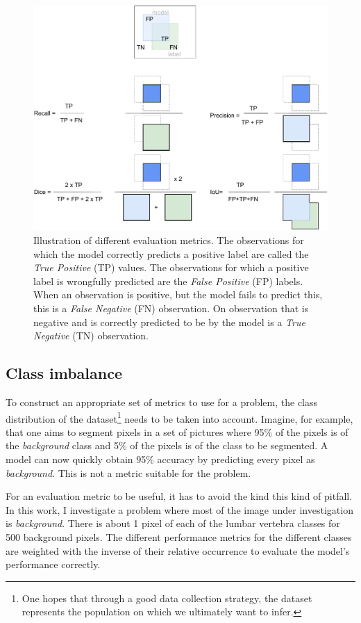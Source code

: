 \begin{figure}
    \centering
    \includegraphics[width=.95\textwidth]{images/Metrics.pdf}
    \caption{Illustration of different evaluation metrics. 
    The observations for which the model correctly predicts a positive label are called the \textit{True Positive} (TP) values.
    The observations for which a positive label is wrongfully predicted are the \textit{False Positive} (FP) labels. 
    When an observation is positive, but the model fails to predict this, this is a \textit{False Negative} (FN) observation.
    On observation that is negative and is correctly predicted to be by the model is a \textit{True Negative} (TN) observation.\label{fig:metrics}
    }
\end{figure}

\subsection{Class imbalance\label{sec:class_imbalance}}
\par{
    To construct an appropriate set of metrics to use for a problem, the class distribution of the dataset\footnote{
        One hopes that through a good data collection strategy, the dataset represents the population on which we ultimately want to infer.
        } needs to be taken into account.
    Imagine, for example, that one aims to segment pixels in a set of pictures where 95\% of the pixels is of the \textit{background} class and 5\% of the pixels is of the class to be segmented.
    A model can now quickly obtain 95\% accuracy by predicting every pixel as \textit{background}. This is not a metric suitable for the problem.
}
\par{
    For an evaluation metric to be useful, it has to avoid the kind this kind of pitfall.
    In this work, I investigate a problem where most of the image under investigation is \textit{background}. 
    There is about 1 pixel of each of the lumbar vertebra classes for 500 background pixels.
    The different performance metrics for the different classes are weighted with the inverse of their relative occurrence to evaluate the model's performance correctly.
}
\newpage
